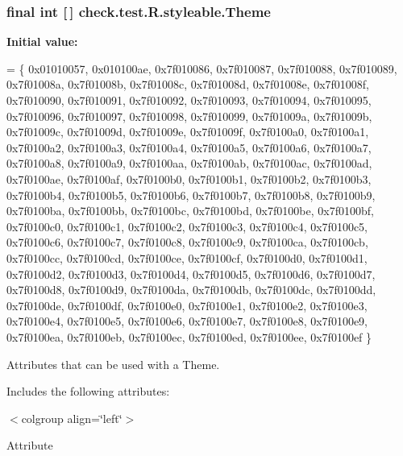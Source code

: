 \subsubsection[{Theme}]{\setlength{\rightskip}{0pt plus 5cm}final int \mbox{[}$\,$\mbox{]} check.\+test.\+R.\+styleable.\+Theme\hspace{0.3cm}{\ttfamily [static]}}\label{classcheck_1_1test_1_1_r_1_1styleable_acca726d02016a0cf607782ec3a436a81}
{\bfseries Initial value\+:}
\begin{DoxyCode}
= \{
            0x01010057, 0x010100ae, 0x7f010086, 0x7f010087,
            0x7f010088, 0x7f010089, 0x7f01008a, 0x7f01008b,
            0x7f01008c, 0x7f01008d, 0x7f01008e, 0x7f01008f,
            0x7f010090, 0x7f010091, 0x7f010092, 0x7f010093,
            0x7f010094, 0x7f010095, 0x7f010096, 0x7f010097,
            0x7f010098, 0x7f010099, 0x7f01009a, 0x7f01009b,
            0x7f01009c, 0x7f01009d, 0x7f01009e, 0x7f01009f,
            0x7f0100a0, 0x7f0100a1, 0x7f0100a2, 0x7f0100a3,
            0x7f0100a4, 0x7f0100a5, 0x7f0100a6, 0x7f0100a7,
            0x7f0100a8, 0x7f0100a9, 0x7f0100aa, 0x7f0100ab,
            0x7f0100ac, 0x7f0100ad, 0x7f0100ae, 0x7f0100af,
            0x7f0100b0, 0x7f0100b1, 0x7f0100b2, 0x7f0100b3,
            0x7f0100b4, 0x7f0100b5, 0x7f0100b6, 0x7f0100b7,
            0x7f0100b8, 0x7f0100b9, 0x7f0100ba, 0x7f0100bb,
            0x7f0100bc, 0x7f0100bd, 0x7f0100be, 0x7f0100bf,
            0x7f0100c0, 0x7f0100c1, 0x7f0100c2, 0x7f0100c3,
            0x7f0100c4, 0x7f0100c5, 0x7f0100c6, 0x7f0100c7,
            0x7f0100c8, 0x7f0100c9, 0x7f0100ca, 0x7f0100cb,
            0x7f0100cc, 0x7f0100cd, 0x7f0100ce, 0x7f0100cf,
            0x7f0100d0, 0x7f0100d1, 0x7f0100d2, 0x7f0100d3,
            0x7f0100d4, 0x7f0100d5, 0x7f0100d6, 0x7f0100d7,
            0x7f0100d8, 0x7f0100d9, 0x7f0100da, 0x7f0100db,
            0x7f0100dc, 0x7f0100dd, 0x7f0100de, 0x7f0100df,
            0x7f0100e0, 0x7f0100e1, 0x7f0100e2, 0x7f0100e3,
            0x7f0100e4, 0x7f0100e5, 0x7f0100e6, 0x7f0100e7,
            0x7f0100e8, 0x7f0100e9, 0x7f0100ea, 0x7f0100eb,
            0x7f0100ec, 0x7f0100ed, 0x7f0100ee, 0x7f0100ef
        \}
\end{DoxyCode}
Attributes that can be used with a Theme. 

Includes the following attributes\+:

\begin{TabularC}{0}
\hline
\end{TabularC}
$<$colgroup align=\char`\"{}left\char`\"{}$>$ 

Attribute

